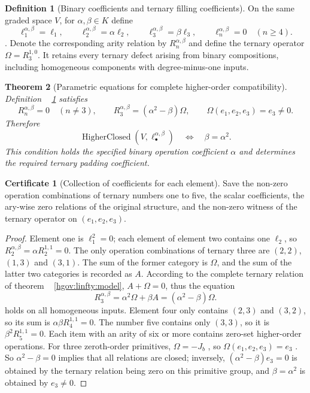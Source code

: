 \documentclass[12pt,a4paper,openany,notitlepage]{report}
\theoremstyle{plain}
\newtheorem{theorem}{Theorem}[chapter]
\theoremstyle{definition}
\newtheorem{definition}[theorem]{Definition}
\newtheorem*{certificate}{Certificate}
\theoremstyle{remark}
\def\mathcal#1{#1}\def\mathsf#1{#1}\def\mathbb#1{#1}%
\begin{document}
\begin{CJK*}
\begin{definition}
[Binary coefficients and ternary filling coefficients]\label{exp:higher:parameter-family}
On the same graded space $V$, for $\alpha,\beta\in\mathbb K$ define
\[
 \ell_1^{\alpha,\beta}=\ell_1,
 \qquad \ell_2^{\alpha,\beta}=\alpha\ell_2,
 \qquad \ell_3^{\alpha,\beta}=\beta\ell_3,
 \qquad \ell_n^{\alpha,\beta}=0\quad(n\ge4).
\].
Denote the corresponding arity relation by $\mathcal R_n^{\alpha,\beta}$ and define the ternary operator
$\Omega=\mathcal R_3^{1,0}$.
It retains every ternary defect arising from binary compositions, including homogeneous components with degree-minus-one inputs.\end{definition}


\begin{theorem}
[Parametric equations for complete higher-order compatibility]\label{exp:higher:scaled-closure}
Definition ~ \ref{exp:higher:parameter-family} satisfies \[
 \mathcal R_n^{\alpha,\beta}=0\quad(n\ne3),
 \qquad
 \mathcal R_3^{\alpha,\beta}=(\alpha^2-\beta)\Omega,
 \qquad
 \Omega(e_1,e_2,e_3)=e_3\ne0.
\] Therefore \[
 \operatorname{HigherClosed}(V,\ell_\bullet^{\alpha,\beta})
 \quad\Longleftrightarrow\quad \beta=\alpha^2.
\] This condition holds the specified binary operation coefficient $\alpha$ and determines the required ternary padding coefficient.\end{theorem}
\begin{certificate}
[Collection of coefficients for each element]Save the non-zero operation combinations of ternary numbers one to five, the scalar coefficients, the ary-wise zero relations of the original structure, and the non-zero witness of the ternary operator on $(e_1,e_2,e_3)$.\end{certificate}
\begin{proof}
Element one is $\ell_1^2=0$; each element of element two contains one $\ell_2$, so $\mathcal R_2^{\alpha,\beta}=\alpha\mathcal R_2^{1,1}=0$. The only operation combinations of ternary three are $(2,2)$, $(1,3)$ and $(3,1)$. The sum of the former category is $\Omega$, and the sum of the latter two categories is recorded as $A$. According to the complete ternary relation of theorem ~ \ref{hgov:linfty:model}, $A+\Omega=0$, thus the equation \[
 \mathcal R_3^{\alpha,\beta}
 =\alpha^2\Omega+\beta A=(\alpha^2-\beta)\Omega.
\] holds on all homogeneous inputs. Element four only contains $(2,3)$ and $(3,2)$, so its sum is $\alpha\beta\mathcal R_4^{1,1}=0$. The number five contains only $(3,3)$, so it is $\beta^2\mathcal R_5^{1,1}=0$. Each item with an arity of six or more contains zero-set higher-order operations. For three zeroth-order primitives, $\Omega=-J_b$ , so $\Omega(e_1,e_2,e_3)=e_3$ . So $\alpha^2-\beta=0$ implies that all relations are closed; inversely, $(\alpha^2-\beta)e_3=0$ is obtained by the ternary relation being zero on this primitive group, and $\beta=\alpha^2$ is obtained by $e_3\ne0$.\end{proof}



\end{CJK*}
\end{document}
